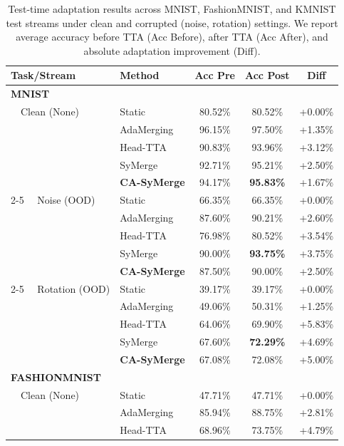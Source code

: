 \documentclass{article}
\begin{document}
\begin{table}[t]
\caption{Test-time adaptation results across MNIST, FashionMNIST, and KMNIST test streams under clean and corrupted (noise, rotation) settings. We report average accuracy before TTA (Acc Before), after TTA (Acc After), and absolute adaptation improvement (Diff).}
\label{tab:results}
\centering
\scriptsize
\setlength{\tabcolsep}{3pt}
\begin{tabular}{llccc}
\toprule
\textbf{Task/Stream} & \textbf{Method} & \textbf{Acc Pre} & \textbf{Acc Post} & \textbf{Diff} \\
\midrule
\textbf{MNIST} \\
~~Clean (None) & Static & 80.52\% & 80.52\% & +0.00\% \\
               & AdaMerging & 96.15\% & 97.50\% & +1.35\% \\
               & Head-TTA & 90.83\% & 93.96\% & +3.12\% \\
               & SyMerge & 92.71\% & 95.21\% & +2.50\% \\
               & \textbf{CA-SyMerge} & 94.17\% & \textbf{95.83\%} & +1.67\% \\
\cmidrule{2-5}
~~Noise (OOD) & Static & 66.35\% & 66.35\% & +0.00\% \\
               & AdaMerging & 87.60\% & 90.21\% & +2.60\% \\
               & Head-TTA & 76.98\% & 80.52\% & +3.54\% \\
               & SyMerge & 90.00\% & \textbf{93.75\%} & +3.75\% \\
               & \textbf{CA-SyMerge} & 87.50\% & 90.00\% & +2.50\% \\
\cmidrule{2-5}
~~Rotation (OOD) & Static & 39.17\% & 39.17\% & +0.00\% \\
               & AdaMerging & 49.06\% & 50.31\% & +1.25\% \\
               & Head-TTA & 64.06\% & 69.90\% & +5.83\% \\
               & SyMerge & 67.60\% & \textbf{72.29\%} & +4.69\% \\
               & \textbf{CA-SyMerge} & 67.08\% & 72.08\% & +5.00\% \\
\midrule
\textbf{FASHIONMNIST} \\
~~Clean (None) & Static & 47.71\% & 47.71\% & +0.00\% \\
               & AdaMerging & 85.94\% & 88.75\% & +2.81\% \\
               & Head-TTA & 68.96\% & 73.75\% & +4.79\% \\

\end{tabular}
\end{table}
\end{document}
